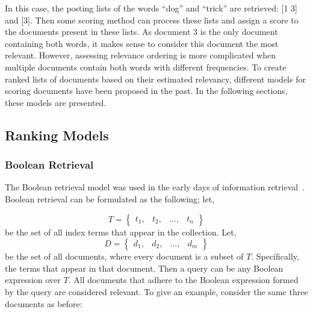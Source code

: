 In this case, the posting lists of the words ``dog'' and ``trick'' are retrieved: [1 3] and [3]. Then some scoring method can process these lists and assign a score to the documents present in these lists. As document 3 is the only document containing both words, it makes sense to consider this document the most relevant. However, assessing relevance ordering is more complicated when multiple documents contain both words with different frequencies. 
To create ranked lists of documents based on their estimated relevancy, different models for scoring documents have been proposed in the past. In the following sections, these models are presented.

\subsection{Ranking Models}

\subsubsection{Boolean Retrieval}\label{sec:boolean}
The Boolean retrieval model was used in the early days of information retrieval~\citep{boolean-1,boolean-2,rijsbergen79information}. Boolean retrieval can be formulated as the following; let, 

\begin{equation}
	T = \begin{Bmatrix}
		t_1, & t_2, & \ldots, & t_n
	\end{Bmatrix}
\end{equation}
be the set of all index terms that appear in the collection. Let,
\begin{equation}
	D = \begin{Bmatrix}
		d_1, & d_2, & \ldots, & d_m
	\end{Bmatrix}
\end{equation}
be the set of all documents, where every document is a subset of $T$. Specifically, the terms that appear in that document. Then a query can be any Boolean expression over $T$. All documents that adhere to the Boolean expression formed by the query are considered relevant. To give an example, consider the same three documents as before:

